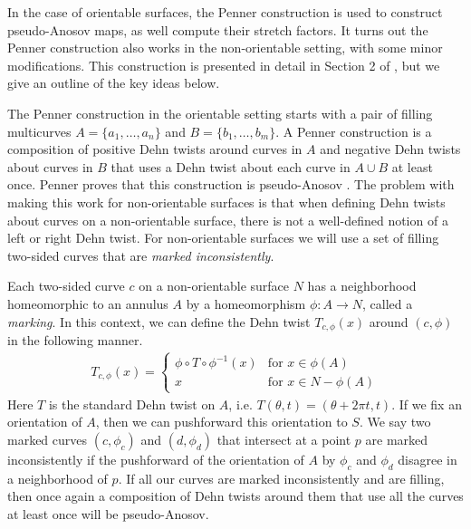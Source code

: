 In the case of orientable surfaces, the Penner construction is used to construct pseudo-Anosov maps, as well compute their stretch factors. It turns out the Penner construction also works in the non-orientable setting, with some minor modifications. This construction is presented in detail in Section 2 of \cite{Strenner_2017}, but we give an outline of the key ideas below.

 The Penner construction in the orientable setting starts with a pair of filling multicurves $A = \{a_1,\dots,a_n\}$
and $B = \{b_1,\dots,b_m\}$.  A Penner construction is a composition of positive Dehn twists around curves in $A$ and negative Dehn twists about curves in $B$ that uses a Dehn twist about each curve in $A\cup B$ at least once.  Penner proves that this construction is pseudo-Anosov \cite{penner1988construction}. The problem with making this work for
non-orientable surfaces is that when defining Dehn twists about curves on a non-orientable surface, there is not a well-defined notion of a left or right Dehn twist. For non-orientable surfaces we will use a set of filling two-sided curves that are \textit{marked inconsistently}.

Each two-sided curve $c$ on a non-orientable surface $N$ has a neighborhood homeomorphic to an
annulus $A$ by a homeomorphism $\phi: A \xrightarrow{} N$, called a \textit{marking}. In this
context, we can define the Dehn twist $T_{c,\phi}(x)$ around $(c,\phi)$ in the following manner.
\begin{align*}
  T_{c,\phi}(x) =
  \begin{cases}
    \phi \circ T \circ \phi^{-1}(x) & \text{for } x \in \phi(A) \\
    x & \text{for } x \in N - \phi(A)
  \end{cases}
\end{align*}
Here $T$ is the standard Dehn twist on $A$, i.e. $T(\theta,t) = (\theta + 2\pi t,t)$. If we fix an
orientation of $A$, then we can pushforward this orientation to $S$. We say two marked curves
$(c,\phi_c)$ and $(d,\phi_d)$ that intersect at a point $p$ are marked inconsistently if the
pushforward of the orientation of $A$ by $\phi_c$ and $\phi_d$ disagree in a neighborhood of $p$.
If all our curves are marked inconsistently and are filling, then once again a composition of Dehn
twists around them that use all the curves at least once will be pseudo-Anosov.

